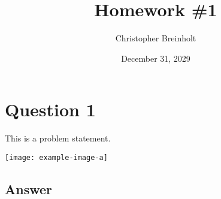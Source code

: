 \documentclass[12pt]{cbhw}
\title{Homework \#1} %
\author{Christopher Breinholt} %
\date{December 31, 2029} %
\begin{document}

\maketitle %

\section*{Question 1} %
\begin{problem}
    This is a problem statement.
\end{problem}

\begin{center}
    \texttt{[image: example-image-a]} %
\end{center}
    
\subsection*{Answer}

\lipsum[1] %
\end{document}
